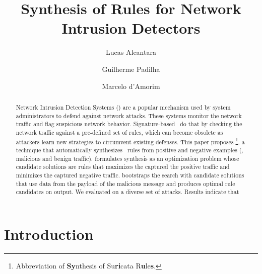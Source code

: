 \documentclass[runningheads]{llncs}
\begin{document}
%
\title{Synthesis of Rules for Network Intrusion Detectors}
%
%
\author{Lucas Alcantara \and
Guilherme Padilha \and
Marcelo d'Amorim}
%
%
%
\maketitle              %
%
\begin{abstract}
Network Intrusion Detection Systems (\nids{}) are a popular mechanism
used by system administrators to defend against network attacks. These
systems monitor the network traffic and flag suspicious network
behavior. Signature-based \nids\ do that by checking the network
traffic against a pre-defined set of rules, which can become obsolete
as attackers learn new strategies to circumvent existing defenses.
This paper proposes \tname{}\footnote{Abbreviation of \textbf{Sy}nthesis of
  Su\textbf{ri}cata R\textbf{u}le\textbf{s}.}, a technique that automatically
synthesizes \nids\ rules from positive and negative examples (\ie{},
malicious and benign traffic). \tname{} formulates synthesis as an
optimization problem whose candidate solutions are rules that
maximizes the captured the positive traffic and minimizes the captured
negative traffic. \tname{} bootstraps the search with candidate
solutions that use data from the payload of the malicious message and
produces optimal rule candidates on output. We evaluated \tname{} on a
diverse set of attacks. Results indicate that 



\end{abstract}
%
%
%
\section{Introduction}
\end{document}
